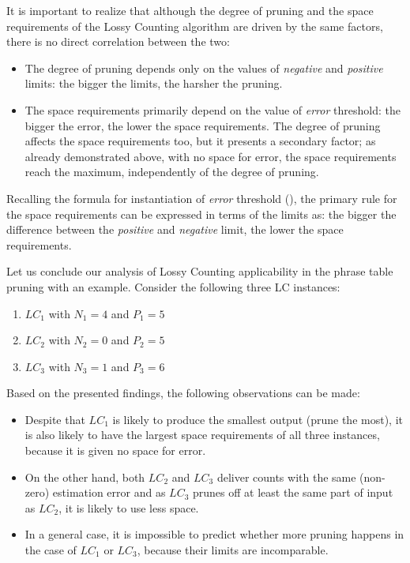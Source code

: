 It is important to realize that although the degree of pruning and
the space requirements of the Lossy Counting algorithm are driven by the same factors,
there is no direct correlation between the two:
\begin{itemize}
  \item The degree of pruning depends only on the values of \emph{negative} and
    \emph{positive} limits: the bigger the limits, the harsher the pruning.
  \item The space requirements primarily depend on the value of \emph{error} threshold:
    the bigger the error, the lower the space requirements.
    The degree of pruning affects the space requirements too, but it presents
    a secondary factor; as already demonstrated above, with no space for error,
    the space requirements reach the maximum, independently of the degree of pruning.
\end{itemize}

Recalling the formula for instantiation of \emph{error} threshold (),
the primary rule for the space requirements can be expressed in terms of the limits as:
the bigger the difference between the \emph{positive} and \emph{negative} limit,
the lower the space requirements.

Let us conclude our analysis of Lossy Counting applicability in the phrase table pruning with
an example. Consider the following three LC instances:
\begin{enumerate}
  \item $LC_{1}$ with $N_{1}=4$ and $P_{1}=5$
  \item $LC_{2}$ with $N_{2}=0$ and $P_{2}=5$
  \item $LC_{3}$ with $N_{3}=1$ and $P_{3}=6$
\end{enumerate}

Based on the presented findings, the following observations can be made:
\begin{itemize}
  \item Despite that $LC_{1}$ is likely to produce the smallest output (prune the most),
    it is also likely to have the largest space requirements of all three instances,
    because it is given no space for error.
  \item On the other hand, both $LC_{2}$ and $LC_{3}$ deliver counts with the same (non-zero)
    estimation error and as $LC_{3}$ prunes off at least the same part of input as $LC_{2}$,
    it is likely to use less space.
  \item In a general case, it is impossible to predict whether more pruning happens
    in the case of $LC_{1}$ or $LC_{3}$, because their limits are incomparable.
\end{itemize}


